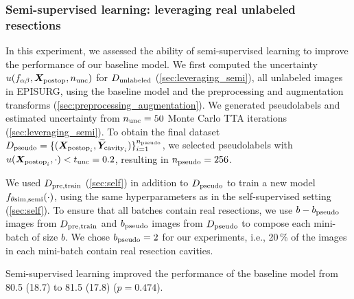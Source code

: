 \subsubsection{Semi-supervised learning: leveraging real unlabeled resections}
\label{sec:results_semi}

\newcommand{\pseudo}{\st{pseudo}}

In this experiment, we assessed the ability of semi-supervised learning to improve the performance of our baseline model.
We first computed the uncertainty $u(f_{\alpha\beta}, \bm{X}_{\text{postop}}, n_{\text{unc}})$ for $D_{\text{unlabeled}}$ (\cref{sec:leveraging_semi}), all unlabeled images in EPISURG, using the baseline model and the preprocessing and augmentation transforms (\cref{sec:preprocessing_augmentation}).
We generated pseudolabels and estimated uncertainty from $n_{\text{unc}} = 50$ Monte Carlo \ac{TTA} iterations (\cref{sec:leveraging_semi}).
To obtain the final dataset $D\pseudo = \{ (\X_{\text{postop}_i}, \wt{\Y}_{\text{cavity}_i}) \}_{i = 1}^{n\pseudo}$, we selected pseudolabels with $u(\bm{X}_{\text{postop}_i}, \cdot) < t_{\text{unc}} = 0.2$, resulting in $n\pseudo = 256$.

We used $D_{\text{pre,train}}$ (\cref{sec:self}) in addition to $D\pseudo$ to train a new model $f_{\theta \text{sim,semi}}(\cdot)$, using the same hyperparameters as in the self-supervised setting (\cref{sec:self}).
To ensure that all batches contain real resections, we use $b - b\pseudo$ images from $D_{\text{pre,train}}$ and $b\pseudo$ images from $D\pseudo$ to compose each mini-batch of size $b$.
We chose $b\pseudo = 2$ for our experiments, i.e., 20\,\% of the images in each mini-batch contain real resection cavities.

Semi-supervised learning improved the performance of the baseline model from 80.5 (18.7) to 81.5 (17.8) ($p = 0.474$).


